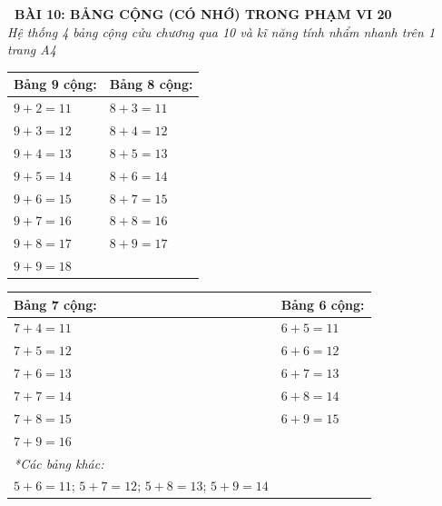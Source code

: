 \documentclass[11pt,a4paper]{article}
\begin{document}
\begin{tcolorbox}[
  enhanced,
  colback=violet!8!white,
  colframe=violet!70!black,
  arc=3mm, boxrule=1.2pt,
  left=3mm, right=3mm, top=2mm, bottom=2mm,
  halign=center
]
  {\LARGE\bfseries\color{violet!90!black}\faBookmark\ BÀI 10: BẢNG CỘNG (CÓ NHỚ) TRONG PHẠM VI 20}\\[1mm]
  {\itshape\footnotesize\color{black!75} Hệ thống 4 bảng cộng cửu chương qua 10 và kĩ năng tính nhẩm nhanh trên 1 trang A4}
\end{tcolorbox}

\vspace{-2mm}

\noindent
\begin{minipage}[t]{0.49\textwidth}\vspace{0pt}
\begin{tcolorbox}[
  enhanced,
  colback=violet!4!white,
  colframe=violet!75!black,
  arc=2mm, boxrule=0.8pt,
  left=2mm, right=2mm, top=1.8mm, bottom=1.8mm,
  title={\footnotesize\bfseries\color{white}\faKey\ 1. Bảng 9 cộng và Bảng 8 cộng}
]
{\footnotesize
\begin{tabular}{l|l}
  \textbf{Bảng 9 cộng:} & \textbf{Bảng 8 cộng:} \\ \hline
  $9 + 2 = 11$ & $8 + 3 = 11$ \\
  $9 + 3 = 12$ & $8 + 4 = 12$ \\
  $9 + 4 = 13$ & $8 + 5 = 13$ \\
  $9 + 5 = 14$ & $8 + 6 = 14$ \\
  $9 + 6 = 15$ & $8 + 7 = 15$ \\
  $9 + 7 = 16$ & $8 + 8 = 16$ \\
  $9 + 8 = 17$ & $8 + 9 = 17$ \\
  $9 + 9 = 18$ &
\end{tabular}
}
\end{tcolorbox}
\end{minipage}
\hfill
\begin{minipage}[t]{0.49\textwidth}\vspace{0pt}
\begin{tcolorbox}[
  enhanced,
  colback=teal!4!white,
  colframe=teal!75!black,
  arc=2mm, boxrule=0.8pt,
  left=2mm, right=2mm, top=1.8mm, bottom=1.8mm,
  title={\footnotesize\bfseries\color{white}\faSliders\ 2. Bảng 7 cộng và Bảng 6 cộng}
]
{\footnotesize
\begin{tabular}{l|l}
  \textbf{Bảng 7 cộng:} & \textbf{Bảng 6 cộng:} \\ \hline
  $7 + 4 = 11$ & $6 + 5 = 11$ \\
  $7 + 5 = 12$ & $6 + 6 = 12$ \\
  $7 + 6 = 13$ & $6 + 7 = 13$ \\
  $7 + 7 = 14$ & $6 + 8 = 14$ \\
  $7 + 8 = 15$ & $6 + 9 = 15$ \\
  $7 + 9 = 16$ & \\
  \multicolumn{2}{l}{\textit{*Các bảng khác:}} \\
  $5 + 6 = 11$; $5 + 7 = 12$; $5 + 8 = 13$; $5 + 9 = 14$
\end{tabular}
}
\end{tcolorbox}
\end{minipage}
\end{document}
